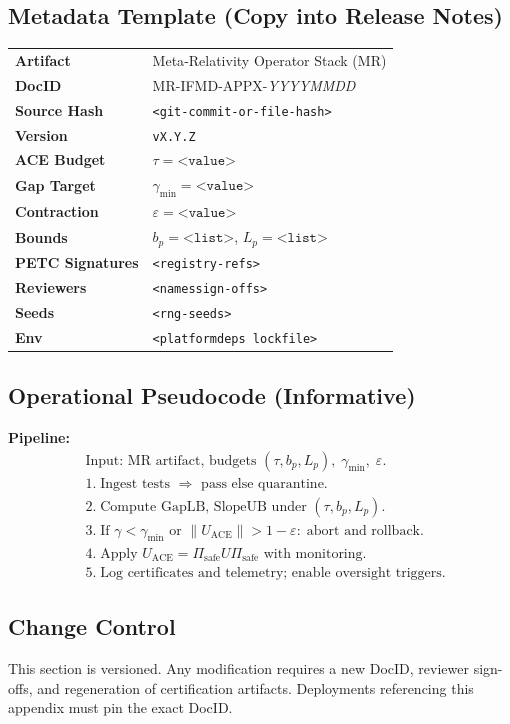 \documentclass[10pt]{article}
\begin{document}
\subsection*{Metadata Template (Copy into Release Notes)}
\begin{tabular}{@{}ll@{}}
\textbf{Artifact} & Meta‑Relativity Operator Stack (MR) \\
\textbf{DocID} & MR-IFMD-APPX-\textit{YYYYMMDD} \\
\textbf{Source Hash} & \texttt{<git-commit-or-file-hash>} \\
\textbf{Version} & \texttt{vX.Y.Z} \\
\textbf{ACE Budget} & \(\tau=\texttt{<value>}\) \\
\textbf{Gap Target} & \(\gamma_{\min}=\texttt{<value>}\) \\
\textbf{Contraction} & \(\varepsilon=\texttt{<value>}\) \\
\textbf{Bounds} & \(b_p=\texttt{<list>}\), \(L_p=\texttt{<list>}\) \\
\textbf{PETC Signatures} & \texttt{<registry-refs>} \\
\textbf{Reviewers} & \texttt{<names\/sign-offs>} \\
\textbf{Seeds} & \texttt{<rng-seeds>} \\
\textbf{Env} & \texttt{<platform\/deps lockfile>} \\
\end{tabular}


\subsection*{Operational Pseudocode (Informative)}
\noindent\textbf{Pipeline:}
\begin{align*}
&\text{Input: MR artifact, budgets } (\tau, b_p, L_p),\; \gamma_{\min},\; \varepsilon.\\
&1.\; \text{Ingest tests }\Rightarrow \text{ pass else quarantine}.\\
&2.\; \text{Compute GapLB, SlopeUB under } (\tau, b_p, L_p).\\
&3.\; \text{If } \gamma\!<\!\gamma_{\min} \text{ or } \|U_{\mathrm{ACE}}\|\!>\!1-\varepsilon:\; \text{abort and rollback}.\\
&4.\; \text{Apply } U_{\mathrm{ACE}} = \Pi_{\mathrm{safe}} U \Pi_{\mathrm{safe}} \text{ with monitoring}.\\
&5.\; \text{Log certificates and telemetry; enable oversight triggers}.
\end{align*}


\subsection*{Change Control}
This section is versioned. Any modification requires a new DocID, reviewer sign-offs, and regeneration of certification artifacts. Deployments referencing this appendix must pin the exact DocID.
\nocite{*}


\end{document}
